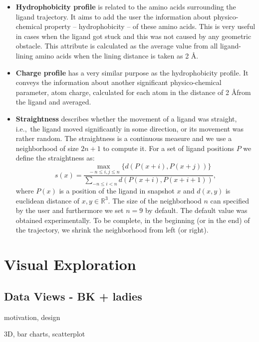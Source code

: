 \documentclass[twocolumn]{bmcart}%
\newcommand{\ie}{i.e.,~}
\begin{document}
\begin{itemize}
\item{\textbf{Hydrophobicity profile}} is related to the amino acids surrounding the ligand trajectory.
It aims to add the user the information about physico-chemical property -- hydrophobicity -- of these amino acids. 
This is very useful in cases when the ligand got stuck and this was not caused by any geometric obstacle.
This attribute is calculated as the average value from all ligand-lining amino acids when the lining distance is taken as 2 \AA.

\item{\textbf{Charge profile}} has a very similar purpose as the hydrophobicity profile.
It conveys the information about another significant physico-chemical parameter, atom charge, calculated for each atom in the distance of 2 \AA from the ligand and averaged.

\item \textbf{Straightness} describes whether the movement of a ligand was straight, \ie the ligand moved significantly in some direction, or its movement was rather random.
The straightness is a continuous measure and we use a neighborhood of size $2n + 1$ to compute it.
For a set of ligand positions $P$ we define the straightness as:
\begin{equation}
  s(x) = \frac{\max_{\,-n \le i, j \le n} \{ d(P(x + i), P(x + j)) \}}{\sum_{-n \le i < n}{d(P(x + i), P(x + i + 1))}},
  \label{eq:straightness}
\end{equation}
where $P(x)$ is a position of the ligand in snapshot $x$ and $d(x, y)$ is euclidean distance of $x, y \in \mathbb{R}^3$.
The size of the neighborhood $n$ can specified by the user and furthermore we set $n = 9$ by default.
The default value was obtained experimentally.
To be complete, in the beginning (or in the end) of the trajectory, we shrink the neighborhood from left (or right).

\end{itemize}

\section*{Visual Exploration}
\subsection*{Data Views - BK + ladies}
motivation, design

3D, bar charts, scatterplot
\end{document}

